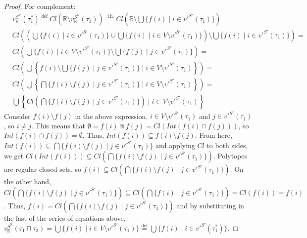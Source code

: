 \documentclass{article}
\newcommand{\R}{\mathbb{R}}
\newcommand{\bcap}{\Cap}
\newcommand{\lcap}{\sqcap}
\newcommand{\lstar}{^*}
\newcommand{\eqdef}{\stackrel{\text{def}}{=}}
\newcommand{\eqih}{\stackrel{\text{ i.h.}}{=}}
\begin{document}
\begin{proof}
    For complement:
    \begin{align*}
      & v_\R^{S^\R}(\tau_1\lstar) \eqdef Cl(\R \setminus v_\R^{S^\R}(\tau_1)) \eqih Cl(\R \setminus \bigcup\{ f(i) \mid i \in v'^{S'}(\tau_1)\}) = \\
      & Cl\left(\left(\bigcup\{ f(i) \mid i \in v'^{S'}(\tau_1)\} \cup \bigcup\{ f(i) \mid i \in V \setminus v'^{S'}(\tau_1)\}\right) \setminus \bigcup\{ f(i) \mid i \in v'^{S'}(\tau_1)\}\right) = \\
      & Cl\left(\bigcup\{ f(i) \mid i \in V \setminus v'^{S'}(\tau_1)\} \setminus \bigcup\{ f(j) \mid j \in v'^{S'}(\tau_1)\}\right) = \\
      & Cl\left(\bigcup\left\{ f(i) \setminus \bigcup\{ f(j) \mid j \in v'^{S'}(\tau_1)\} \mid i \in V \setminus v'^{S'}(\tau_1)\right\}\right) = \\
      & Cl\left(\bigcup\left\{ \bigcap\{ f(i) \setminus f(j) \mid j \in v'^{S'}(\tau_1)\} \mid i \in V \setminus v'^{S'}(\tau_1)\right\}\right) = \\
      & \bigcup\left\{ Cl\left(\bigcap\{ f(i) \setminus f(j) \mid j \in v'^{S'}(\tau_1)\}\right) \mid i \in V \setminus v'^{S'}(\tau_1)\right\}
    \end{align*}
    Consider $f(i) \setminus f(j)$ in the above expression. $i \in V \setminus v'^{S'}(\tau_1)$ and $j \in v'^{S'}(\tau_1)$, so $i \neq j$. This means that $\emptyset = f(i) \bcap f(j) = Cl(Int(f(i) \cap f(j)))$, so \\
    $Int(f(i) \cap f(j)) = \emptyset$. Thus, $Int(f(i)) \subseteq f(i) \setminus f(j)$. From here, \\
    $Int(f(i)) \subseteq \bigcap\{ f(i) \setminus f(j) \mid j \in v'^{S'}(\tau_1)\}$ and applying $Cl$ to both sides, we get $Cl(Int(f(i))) \subseteq Cl\left(\bigcap\{ f(i) \setminus f(j) \mid j \in v'^{S'}(\tau_1)\}\right)$. Polytopes are regular closed sets, so $f(i) \subseteq Cl\left(\bigcap\{ f(i) \setminus f(j) \mid j \in v'^{S'}(\tau_1)\}\right)$. On the other hand, $Cl\left(\bigcap\{ f(i) \setminus f(j) \mid j \in v'^{S'}(\tau_1)\}\right) \subseteq Cl\left(\bigcap\{ f(i) \mid j \in v'^{S'}(\tau_1)\}\right) = Cl(f(i)) = f(i)$. Thus, $f(i) = Cl\left(\bigcap\{ f(i) \setminus f(j) \mid j \in v'^{S'}(\tau_1)\}\right)$ and by substituting in the last of the series of equations above, $v_\R^{S^\R}(\tau_1 \lcap \tau_2) = \bigcup\{ f(i) \mid i \in V \setminus v'^{S'}(\tau_1)\} \eqdef \bigcup\{ f(i) \mid i \in v'^{S'}(\tau_1\lstar)\}$.


\end{proof}
\end{document}
